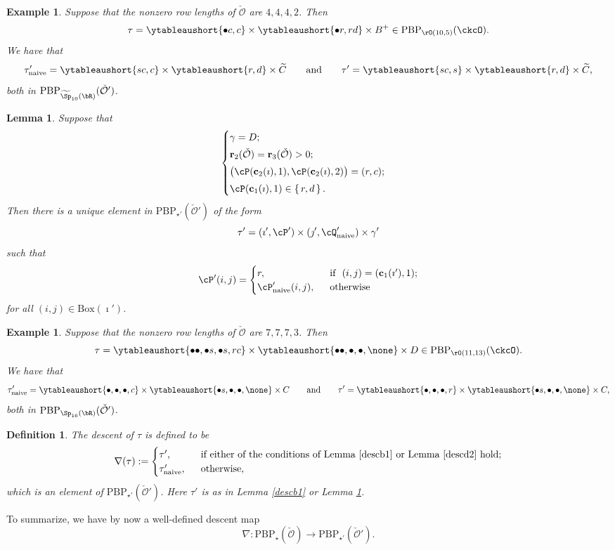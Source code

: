 \documentclass[11pt,a4paper]{amsart}
\newcommand{\CO}{{\mathcal {O}}}
\numberwithin{equation}{section}
\newtheorem{lem}[thm]{Lemma}
\newtheorem{defn}[thm]{Definition}
\newtheorem{eg}[thm]{Example}
\theoremstyle{remark}
\let\ytb=\ytableaushort
\def\BOX{\mathrm{Box}}
\def\PBP{\mathrm{PBP}}
\begin{document}
\begin{eg} Suppose that  the nonzero row lengths of $\check \CO$ are $4,4,4,2$. Then 
 \[
 \tau= \ytb{\bullet c, c} \times \ytb{\bullet r, rd}\times
  B^+ \in \PBP_{\rO(10,5)}(\ckcO).
 \]
We have that
\[
 \tau'_{\mathrm{naive}}= \ytb{s c, c} \times \ytb{r, d}\times
  \widetilde C\qquad\textrm{and}\qquad \tau'= \ytb{s c, s} \times \ytb{r, d}\times
  \widetilde C,
 \]
both in $\PBP_{\widetilde \Sp_{10}(\bR)}(\check \CO')$. 
\end{eg}


\begin{lem}\label{descd2}
  Suppose that
  \[  \begin{cases}
 \gamma = D; & \smallskip \\
\mathbf r_2(\check \CO)=\mathbf r_3(\check \CO)>0;  &\smallskip\\
\left(\cP(\mathbf c_2(\imath),1), \textrm{\vrule width 0pt  height 0.9em  \relax} \cP(\mathbf c_2(\imath),2)\right)=(r,c); &\smallskip\\
 \cP(\mathbf c_1(\imath),1)\in \set{r,d}.
\end{cases}
\]
 Then there is a unique element in $\mathrm{PBP}_{\star'}(\check \CO')$ of the form
  \[
      \tau'=(\imath', \cP')\times (\jmath', \cQ'_{\mathrm{naive}} )\times \gamma '
  \]
  such that 
  \[
\cP'(i,j) = \begin{cases}
  r, & \ \text{ if } \ (i,j) = (\mathbf c_1(\imath'),1); \\
  \cP'_{\mathrm{naive}}(i,j), & \ \text{ otherwise}
\end{cases}
\]
 for all $(i,j)\in \BOX(\imath')$.
\end{lem}


\begin{eg} Suppose that the nonzero row lengths of $\check \CO$ are $7,7,7,3$. 
Then
 \[
 \tau= \ytb{\bullet\bullet, \bullet s, \bullet s, r c} \times \ytb{\bullet\bullet,\bullet,\bullet, \none }\times
  D \in \PBP_{\rO(11,13)}(\ckcO).
 \]
We have that  
\[
 \tau'_{\mathrm{naive}}=\ytb{\bullet, \bullet , \bullet ,  c} \times \ytb{\bullet s,\bullet,\bullet, \none } \times
  C\qquad\textrm{and}\qquad \tau'=\ytb{\bullet, \bullet , \bullet ,  r} \times \ytb{\bullet s,\bullet,\bullet, \none } \times
  C,
 \]
both in $\PBP_{\Sp_{16}(\bR)}(\check \CO')$.
\end{eg}

\begin{defn}
The descent of $\tau$ is defined to be
\[
  \nabla(\tau):= \begin{cases}
  \tau', & \ \text{ if either of the conditions of Lemma \ref{descb1}  or Lemma \ref{descd2} hold}; \\
  \tau'_\mathrm{naive}, %
  & \ \text{ otherwise},
\end{cases}
\]
which is an element of $  \mathrm{PBP}_{\star'}(\check \CO')$.
Here $\tau'$ is as in Lemma  \ref{descb1} or Lemma \ref{descd2}.
\end{defn}
To summarize, we have by now a well-defined descent map
\begin{equation}\label{def:dspbp}
\nabla: \mathrm{PBP}_{\star}(\check \CO)\rightarrow \mathrm{PBP}_{\star'}(\check \CO').
\end{equation}
\end{document}
